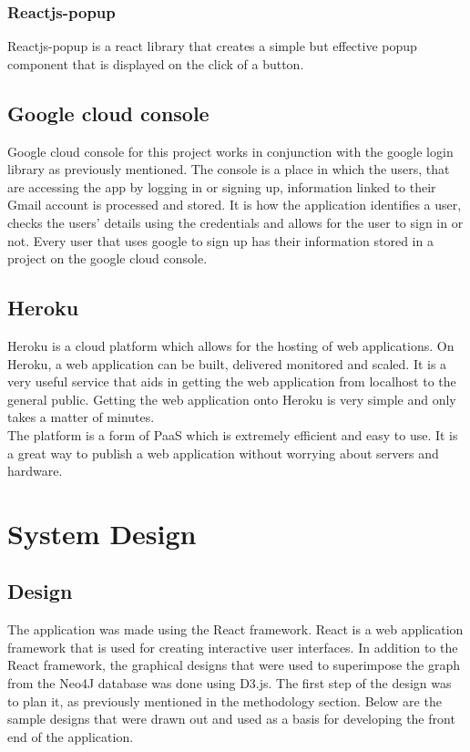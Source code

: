 \subsection{Reactjs-popup}

Reactjs-popup is a react library that creates a simple but effective popup component that is displayed on the click of a button.\cite{popup}\\

\section{Google cloud console}

Google cloud console for this project works in conjunction with the google login library as previously mentioned. The console is a place in which the users, that are accessing the app by logging in or signing up, information linked to their Gmail account is processed and stored. It is how the application identifies a user, checks the users’ details using the credentials and allows for the user to sign in or not. Every user that uses google to sign up has their information stored in a project on the google cloud console.\cite{cloud} \\

\section{Heroku}

Heroku is a cloud platform which allows for the hosting of web applications. On Heroku, a web application can be built, delivered monitored and scaled. It is a very useful service that aids in getting the web application from localhost to the general public. Getting the web application onto Heroku is very simple and only takes a matter of minutes.\cite{Heroku1} \\

The platform is a form of PaaS which is extremely efficient and easy to use. It is a great way to publish a web application without worrying about servers and hardware.\cite{Heroku2} \\

\chapter{System Design}

\section{Design}
The application was made using the React framework. React is a web application framework that is used for creating interactive user interfaces. In addition to the React framework, the graphical designs that were used to superimpose the graph from the Neo4J database was done using D3.js. The first step of the design was to plan it, as previously mentioned in the methodology section. Below are the sample designs that were drawn out and used as a basis for developing the front end of the application. \\

